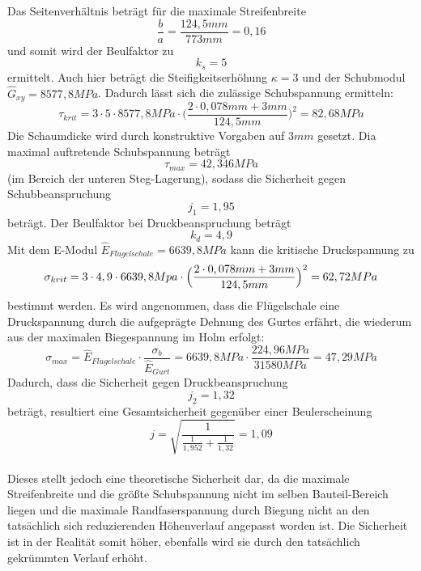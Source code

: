 \noindent Das Seitenverhältnis beträgt für die maximale Streifenbreite
\begin{equation}
	\frac{b}{a}=\frac{124,5 mm}{773 mm}=0,16
\end{equation}
und somit wird der Beulfaktor zu 
\begin{equation}
	k_{s}=5
\end{equation} 
ermittelt. Auch hier beträgt die Steifigkeitserhöhung $\kappa=3$ und der Schubmodul $\hat{G}_{xy}=8577,8 MPa$. Dadurch lässt sich die zulässige Schubspannung ermitteln:
\begin{equation}
	\tau_{krit}=3\cdot 5\cdot 8577,8 MPa\cdot\biggl(\frac{2\cdot 0,078mm + 3mm}{124,5 mm}\biggr)^{2} =82,68 MPa
\end{equation}
Die Schaumdicke wird durch konstruktive Vorgaben auf $3 mm$ gesetzt. Dia maximal auftretende Schubspannung beträgt
\begin{equation}
	\tau_{max}=42,346 MPa
\end{equation}
(im Bereich der unteren Steg-Lagerung), sodass die Sicherheit gegen Schubbeanspruchung 
\begin{equation}
	j_{1}=1,95
\end{equation}
beträgt. Der Beulfaktor bei Druckbeanspruchung beträgt
\begin{equation}
	k_{d} = 4,9
\end{equation}
Mit dem E-Modul $\hat{E}_{Fl\ddot{u}gelschale} = 6639,8 MPa$ kann die kritische Druckspannung zu
\begin{equation}
	\sigma_{krit} = 3\cdot 4,9\cdot 6639,8 Mpa\cdot\Bigl(\frac{2\cdot 0,078mm+3mm}{124,5mm}\Bigr)^{2}=62,72 MPa
\end{equation}
bestimmt werden. Es wird angenommen, dass die Flügelschale eine Druckspannung durch die aufgeprägte Dehnung des Gurtes erfährt, die wiederum aus der maximalen Biegespannung im Holm erfolgt:
\begin{equation}
	\sigma_{max}=\hat{E}_{Fl\ddot{u}gelschale}\cdot\frac{\sigma_{b}}{\hat{E}_{Gurt}}=6639,8 MPa\cdot\frac{224,96 MPa}{31580 MPa}=47,29 MPa
\end{equation}
Dadurch, dass die Sicherheit gegen Druckbeanspruchung
\begin{equation}
	j_{2}=1,32
\end{equation}
beträgt, resultiert eine Gesamtsicherheit gegenüber einer Beulerscheinung
\begin{equation}\label{Hautbeulen}
	j=\sqrt{\frac{1}{\frac{1}{1,952}+\frac{1}{1,32}}}=1,09
\end{equation}\\

 \noindent Dieses stellt jedoch eine theoretische Sicherheit dar, da die maximale Streifenbreite und die größte Schubspannung nicht im selben Bauteil-Bereich liegen und die maximale Randfaserspannung durch Biegung nicht an den tatsächlich sich reduzierenden Höhenverlauf angepasst worden ist. Die Sicherheit ist in der Realität somit höher, ebenfalls wird sie durch den tatsächlich gekrümmten Verlauf erhöht.